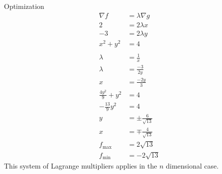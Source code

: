 \documentclass[8pt]{extarticle}
\begin{document}
\begin{problem}{Optimization}
\begin{align*}
      \nabla f &= \lambda \nabla g\\
      2 &= 2\lambda x\\
      -3 &= 2\lambda y\\
      x^2 +y^2 &= 4\\
      \\
      \lambda &= \frac{1}{x}\\
      \lambda &= \frac{-3}{2y}\\
      x &= \frac{-2y}{3}\\
      \frac{4y^2}{9} + y^2 &= 4\\
      -\frac{13}{9}y^2 &= 4\\
      y &= \pm\frac{6}{\sqrt{13}}\\
      x &= \mp \frac{4}{\sqrt{13}}\\
      f_{\text{max}} &= 2\sqrt{13}\\
      f_{\text{min}} &= -2\sqrt{13}
    \end{align*}
    This system of Lagrange multipliers applies in the $n$ dimensional case.\\


\end{problem}
\end{document}
